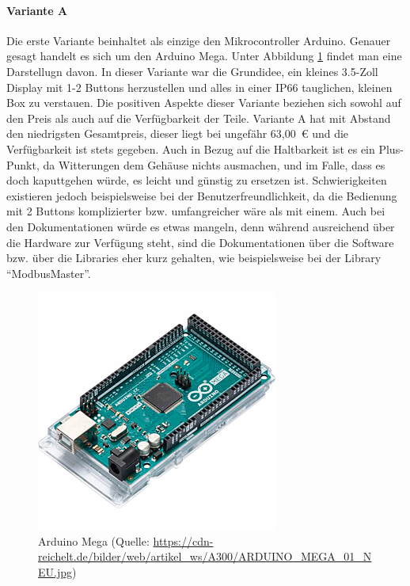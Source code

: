 \paragraph{Variante A}
Die erste Variante beinhaltet als einzige den Mikrocontroller Arduino. Genauer gesagt handelt es sich um den Arduino Mega. Unter Abbildung \ref{fig:arduino_mega} findet man eine Darstellugn davon. In dieser Variante war die Grundidee, ein kleines 3.5-Zoll Display mit 1-2 Buttons herzustellen und alles in einer IP66 tauglichen, kleinen Box zu verstauen. 
Die positiven Aspekte dieser Variante beziehen sich sowohl auf den Preis als auch auf die Verfügbarkeit der Teile. Variante A hat mit Abstand den niedrigsten Gesamtpreis, dieser liegt bei ungefähr 63,00 € und die Verfügbarkeit ist stets gegeben. Auch in Bezug auf die Haltbarkeit ist es ein Plus-Punkt, da Witterungen dem Gehäuse nichts ausmachen, und im Falle, dass es doch kaputtgehen würde, es leicht und günstig zu ersetzen ist. Schwierigkeiten existieren jedoch beispielsweise bei der Benutzerfreundlichkeit, da die Bedienung mit 2 Buttons komplizierter bzw. umfangreicher wäre als mit einem. Auch bei den Dokumentationen würde es etwas mangeln, denn während ausreichend über die Hardware zur Verfügung steht, sind die Dokumentationen über die Software bzw. über die Libraries eher kurz gehalten, wie beispielsweise bei der Library \enquote{ModbusMaster}.
\begin{figure}[ht]
	\centering
	\includegraphics[width=0.5\linewidth]{Bilder/ARDUINO_MEGA.jpg}
	\caption{Arduino Mega (Quelle: \url{https://cdn-reichelt.de/bilder/web/artikel_ws/A300/ARDUINO_MEGA_01_NEU.jpg})}
	\label{fig:arduino_mega}
\end{figure}
